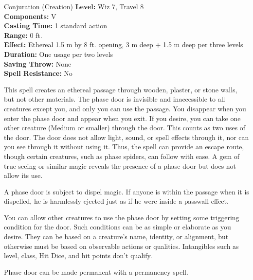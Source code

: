 {Conjuration (Creation)}
{
	\textbf{Level:}
	Wiz 7, Travel 8\\
	\textbf{Components:}
	V\\
	\textbf{Casting Time:}
	1 standard action\\
	\textbf{Range:}
	0 ft.\\
	\textbf{Effect:}
	Ethereal 1.5 m by 8 ft. opening, 3 m deep + 1.5 m deep per three levels\\
	\textbf{Duration:}
	One usage per two levels\\
	\textbf{Saving Throw:}
	None\\
	\textbf{Spell Resistance:}
	No\\
}
{
	This spell creates an ethereal passage through wooden, plaster, or stone walls, but not other materials. The phase door is invisible and inaccessible to all creatures except you, and only you can use the passage. You disappear when you enter the phase door and appear when you exit. If you desire, you can take one other creature (Medium or smaller) through the door. This counts as two uses of the door. The door does not allow light, sound, or spell effects through it, nor can you see through it without using it. Thus, the spell can provide an escape route, though certain creatures, such as phase spiders, can follow with ease. A gem of true seeing or similar magic reveals the presence of a phase door but does not allow its use.

	A phase door is subject to dispel magic. If anyone is within the passage when it is dispelled, he is harmlessly ejected just as if he were inside a passwall effect.

	You can allow other creatures to use the phase door by setting some triggering condition for the door. Such conditions can be as simple or elaborate as you desire. They can be based on a creature's name, identity, or alignment, but otherwise must be based on observable actions or qualities. Intangibles such as level, class, Hit Dice, and hit points don't qualify.

	Phase door can be made permanent with a permanency spell.

}
